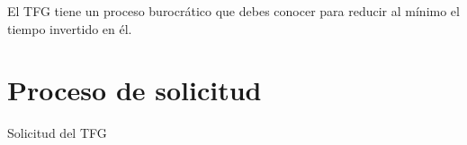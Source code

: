 El TFG tiene un proceso burocrático que debes conocer para reducir al mínimo el tiempo invertido en él.

\section{Proceso de solicitud}

Solicitud del TFG




